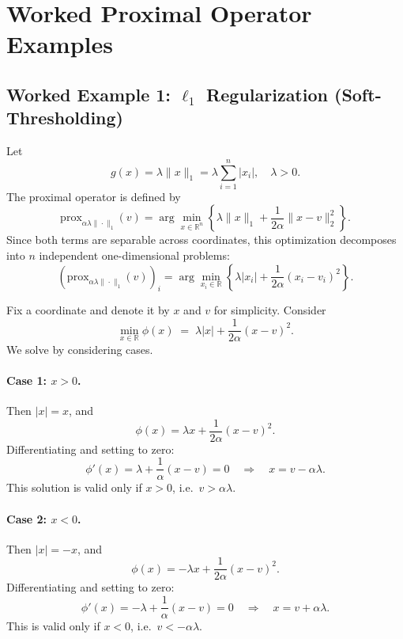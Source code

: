 \documentclass[11pt]{article}
\begin{document}
\section{Worked Proximal Operator Examples}

\subsection{Worked Example 1: \texorpdfstring{$\ell_1$}{l1} Regularization (Soft-Thresholding)}

Let
\begin{equation}
g(x) = \lambda \|x\|_1 = \lambda \sum_{i=1}^n |x_i|,
\quad \lambda>0.
\end{equation}
The proximal operator is defined by
\begin{equation}
\mathrm{prox}_{\alpha \lambda\|\cdot\|_1}(v)
=
\arg\min_{x\in\mathbb{R}^n}
\left\{
\lambda\|x\|_1 + \frac{1}{2\alpha}\|x-v\|_2^2
\right\}.
\end{equation}
Since both terms are separable across coordinates, this optimization decomposes into $n$ independent one-dimensional problems:
\begin{equation}
\left(\mathrm{prox}_{\alpha \lambda\|\cdot\|_1}(v)\right)_i
=
\arg\min_{x_i\in\mathbb{R}}
\left\{
\lambda|x_i| + \frac{1}{2\alpha}(x_i-v_i)^2
\right\}.
\end{equation}

Fix a coordinate and denote it by $x$ and $v$ for simplicity. Consider
\begin{equation}
\min_{x\in\mathbb{R}}
\phi(x)
\;=\;
\lambda|x| + \frac{1}{2\alpha}(x-v)^2.
\end{equation}
We solve by considering cases.

\paragraph{Case 1: $x>0$.}
Then $|x|=x$, and
\[
\phi(x) = \lambda x + \frac{1}{2\alpha}(x-v)^2.
\]
Differentiating and setting to zero:
\[
\phi'(x) = \lambda + \frac{1}{\alpha}(x-v) = 0
\quad\Rightarrow\quad
x = v - \alpha\lambda.
\]
This solution is valid only if $x>0$, i.e.\ $v>\alpha\lambda$.

\paragraph{Case 2: $x<0$.}
Then $|x|=-x$, and
\[
\phi(x) = -\lambda x + \frac{1}{2\alpha}(x-v)^2.
\]
Differentiating and setting to zero:
\[
\phi'(x) = -\lambda + \frac{1}{\alpha}(x-v) = 0
\quad\Rightarrow\quad
x = v + \alpha\lambda.
\]
This is valid only if $x<0$, i.e.\ $v<-\alpha\lambda$.
\end{document}
